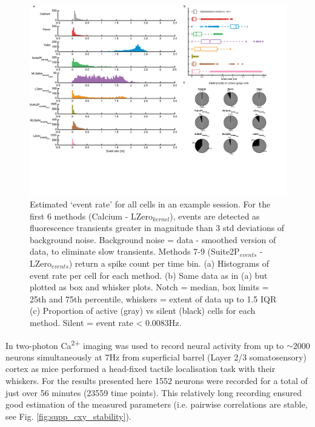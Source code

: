 \documentclass[a4paper,10pt,twocolumn]{article}
\begin{document}
\begin{figure}
\includegraphics[trim={0 85 40 0},clip,width=\textwidth]{full_figs/why_deconvolve_F3_3.png}
\caption{\label{fig:simple_stats} Estimated `event rate' for all cells in an example session. For the first 6 methods (Calcium - LZero$_{kernel}$), events are detected as fluorescence transients greater in magnitude than 3 std deviations of background noise. Background noise = data - smoothed version of data, to eliminate slow transients. Methods 7-9 (Suite2P$_{events}$ - LZero$_{events}$) return a spike count per time bin. (a) Histograms of event rate per cell for each method. (b) Same data as in (a) but plotted as box and whisker plots. Notch = median, box limits = 25th and 75th percentile, whiskers = extent of data up to 1.5 IQR (c) Proportion of active (gray) vs silent (black) cells for each method. Silent = event rate < 0.0083Hz.}
\end{figure}

In \citealt{Peron2015-qz} two-photon Ca\textsuperscript{2+} imaging was used to record neural activity from up to $\sim$2000 neurons simultaneously at 7Hz from superficial barrel (Layer 2/3 somatosensory) cortex as mice performed a head-fixed tactile localisation task with their whiskers. For the results presented here 1552 neurons were recorded for a total of just over 56 minutes (23559 time points). This relatively long recording ensured good estimation of the measured parameters (i.e. pairwise correlations are stable, see Fig. \ref{fig:supp_cxy_stability}).


\end{document}
